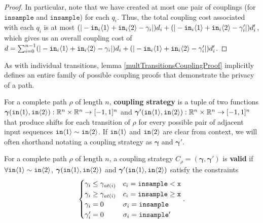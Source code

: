 \begin{proof}
    In particular, note that we have created at most one pair of couplings (for $\texttt{insample}$ and $\texttt{insample}$) for each $q_i$. Thus, the total coupling cost associated with each $q_i$ is at most $(|-\texttt{in}_i\brangle{1}+\texttt{in}_i\brangle{2}-\gamma_i|)d_i+(|-\texttt{in}_i\brangle{1}+\texttt{in}_i\brangle{2}-\gamma_i'|)d_i'$, 
    which gives us an overall coupling cost of $d = \sum_{i=0}^{n-1}(|-\texttt{in}_i\brangle{1}+\texttt{in}_i\brangle{2}-\gamma_i|)d_i+(|-\texttt{in}_i\brangle{1}+\texttt{in}_i\brangle{2}-\gamma_i'|)d_i'$.
\end{proof}

As with individual transitions, lemma \ref{multTransitionsCouplingProof} implicitly defines an entire family of possible coupling proofs that demonstrate the privacy of a path.

\begin{defn}
    For a complete path $\rho$ of length $n$, \textbf{coupling strategy} is a tuple of two functions $\bm{\gamma}(\texttt{in}\brangle{1}, \texttt{in}\brangle{2}):\RR^n\times \RR^n\to [-1, 1]^n$ and $\bm{\gamma}'(\texttt{in}\brangle{1}, \texttt{in}\brangle{2}):\RR^n\times \RR^n\to [-1, 1]^n$ that produce shifts for each transition of $\rho$ for every possible pair of adjacent input sequences $\texttt{in}\brangle{1}\sim\texttt{in}\brangle{2}$. 
    If $\texttt{in}\brangle{1}$ and $\texttt{in}\brangle{2}$ are clear from context, we will often shorthand notating a coupling strategy as $\bm{\gamma}$ and $\bm{\gamma}'$. 
\end{defn}


\begin{defn}
    For a complete path $\rho$ of length $n$, a coupling strategy $C_\rho = (\bm{\gamma}, \bm{\gamma}')$ is \textbf{valid} if $\forall \texttt{in}\brangle{1}\sim\texttt{in}\brangle{2}$, $\bm{\gamma}(\texttt{in}\brangle{1}, \texttt{in}\brangle{2})$ and $\bm{\gamma}'(\texttt{in}\brangle{1}, \texttt{in}\brangle{2})$ satisfy the constraints \[
        \begin{cases}
          \gamma_i\leq\gamma_{at(i)} & c_i = \lguard[\texttt{x}]\\
          \gamma_i\geq\gamma_{at(i)} & c_i = \gguard[\texttt{x}]\\
          \gamma_i=0 & \sigma_i = \texttt{insample}\\
          \gamma_i'=0 & \sigma_i = \texttt{insample}'
        \end{cases}.
      \]
\end{defn}


